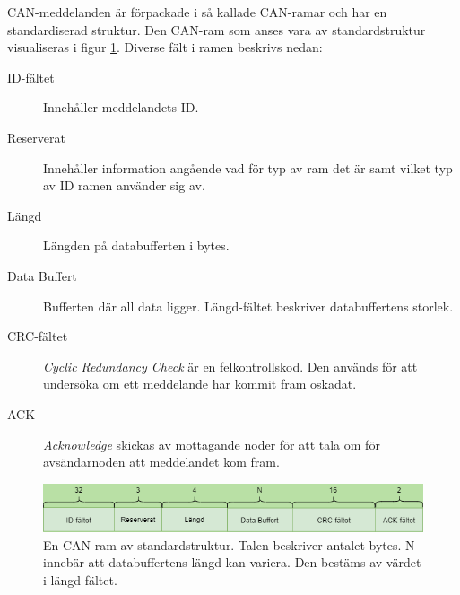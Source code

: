 CAN-meddelanden är förpackade i så kallade CAN-ramar och har en standardiserad struktur. Den CAN-ram som anses vara av standardstruktur visualiseras i figur \ref{fig:can_frame}. Diverse fält i ramen beskrivs nedan:
\begin{description}
    \item[ID-fältet] {Innehåller meddelandets ID.}
    \item[Reserverat] {Innehåller information angående vad för typ av ram det är samt vilket typ av ID ramen använder sig av.}
    \item[Längd] {Längden på databufferten i bytes.}
    \item[Data Buffert] {Bufferten där all data ligger. Längd-fältet beskriver databuffertens storlek.}
    \item[CRC-fältet] {\emph{Cyclic Redundancy Check} är en felkontrollskod. Den används för att undersöka om ett meddelande har kommit fram oskadat.}
    \item[ACK] {\emph{Acknowledge} skickas av mottagande noder för att tala om för avsändarnoden att meddelandet kom fram. }
\end{description}
\begin{figure}[h]
    \centering
    \includegraphics[scale=0.52]{dokumentation/projektrapport/IMAGES/can_frame.png}
    \caption{En CAN-ram av standardstruktur. Talen beskriver antalet bytes. N innebär att databuffertens längd kan variera. Den bestäms av värdet i längd-fältet.}
    \label{fig:can_frame}
\end{figure}


